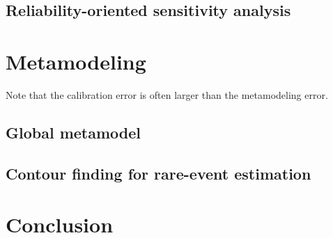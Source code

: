 \subsection{Reliability-oriented sensitivity analysis}





\section{Metamodeling}
Note that the calibration error is often larger than the metamodeling error.

\subsection{Global metamodel}

\subsection{Contour finding for rare-event estimation}






\section{Conclusion}
